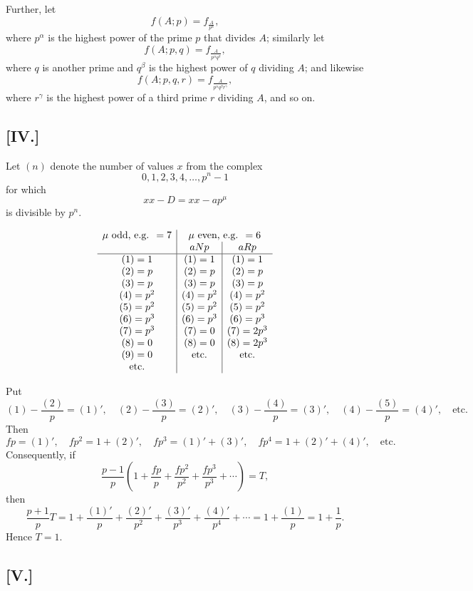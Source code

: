 \documentclass[12pt]{article}
\begin{document}
Further, let
\[
f(A;p)=f_{\frac{A}{p^\alpha}},
\]
where $p^\alpha$ is the highest power of the prime $p$ that divides $A$; similarly let
\[
f(A;p,q)=f_{\frac{A}{p^\alpha q^\beta}},
\]
where $q$ is another prime and $q^\beta$ is the highest power of $q$ dividing $A$; and likewise
\[
f(A;p,q,r)=f_{\frac{A}{p^\alpha q^\beta r^\gamma}},
\]
where $r^\gamma$ is the highest power of a third prime $r$ dividing $A$, and so on.

\subsection*{[IV.]}

Let $(n)$ denote the number of values $x$ from the complex
\[
0,1,2,3,4,\ldots,p^n-1
\]
for which
\[
xx-D=xx-ap^\mu
\]
is divisible by $p^n$.

\[
\begin{array}{c|c|c}
\mu\ \text{odd, e.g. }=7&\multicolumn{2}{c}{\mu\ \text{even, e.g. }=6}\\
& aNp&aRp\\ \hline
(1)=1&(1)=1&(1)=1\\
(2)=p&(2)=p&(2)=p\\
(3)=p&(3)=p&(3)=p\\
(4)=p^2&(4)=p^2&(4)=p^2\\
(5)=p^2&(5)=p^2&(5)=p^2\\
(6)=p^3&(6)=p^3&(6)=p^3\\
(7)=p^3&(7)=0&(7)=2p^3\\
(8)=0&(8)=0&(8)=2p^3\\
(9)=0&\text{etc.}&\text{etc.}\\
\text{etc.}&&
\end{array}
\]

Put
\[
(1)-\frac{(2)}{p}=(1)',\quad
(2)-\frac{(3)}{p}=(2)',\quad
(3)-\frac{(4)}{p}=(3)',\quad
(4)-\frac{(5)}{p}=(4)',\quad\text{etc.}
\]
Then
\[
fp=(1)',\quad
fp^2=1+(2)',\quad
fp^3=(1)'+(3)',\quad
fp^4=1+(2)'+(4)',\quad\text{etc.}
\]
Consequently, if
\[
\frac{p-1}{p}\left(1+\frac{fp}{p}+\frac{fp^2}{p^2}+\frac{fp^3}{p^3}+\cdots\right)=T,
\]
then
\[
\frac{p+1}{p}T
=
1+\frac{(1)'}{p}+\frac{(2)'}{p^2}+\frac{(3)'}{p^3}+\frac{(4)'}{p^4}+\cdots
=
1+\frac{(1)}{p}
=
1+\frac1p .
\]
Hence $T=1$.

\subsection*{[V.]}
\end{document}
